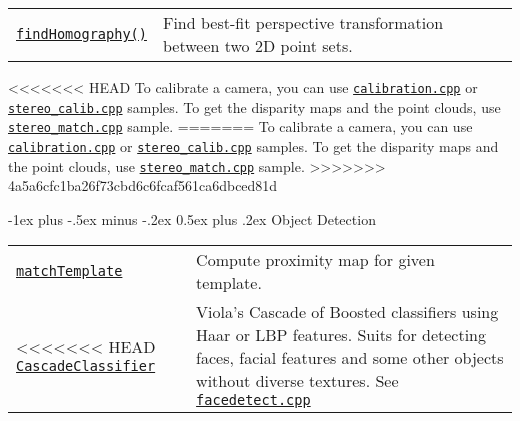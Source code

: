 \documentclass[10pt,landscape]{article}
\makeatletter
\renewcommand{\section}{\@startsection{section}{1}{0mm}%
                                {-1ex plus -.5ex minus -.2ex}%
                                {0.5ex plus .2ex}%
                                {\normalfont\large\bfseries}}
\makeatother
\begin{document}
\begin{multicols}{3}
\begin{tabular}{@{}p{\the\MyLen}%
                @{}p{\linewidth-\the\MyLen}@{}}
\texttt{\href{http://docs.opencv.org/modules/calib3d/doc/camera_calibration_and_3d_reconstruction.html\#findhomography}{findHomography()}} & Find best-fit perspective transformation between two 2D point sets. \\

\end{tabular}

<<<<<<< HEAD
To calibrate a camera, you can use \texttt{\href{https://github.com/Itseez/opencv/tree/master/samples/cpp/calibration.cpp}{calibration.cpp}} or
\texttt{\href{https://github.com/Itseez/opencv/tree/master/samples/cpp/stereo\_calib.cpp}{stereo\_calib.cpp}} samples.
To get the disparity maps and the point clouds, use
\texttt{\href{https://github.com/Itseez/opencv/tree/master/samples/cpp/stereo\_match.cpp}{stereo\_match.cpp}} sample.
=======
To calibrate a camera, you can use \texttt{\href{https://github.com/opencv/opencv/tree/master/samples/cpp/calibration.cpp}{calibration.cpp}} or
\texttt{\href{https://github.com/opencv/opencv/tree/master/samples/cpp/stereo\_calib.cpp}{stereo\_calib.cpp}} samples.
To get the disparity maps and the point clouds, use
\texttt{\href{https://github.com/opencv/opencv/tree/master/samples/cpp/stereo\_match.cpp}{stereo\_match.cpp}} sample.
>>>>>>> 4a5a6cfc1ba26f73cbd6c6fcaf561ca6dbced81d

\section{Object Detection}

\begin{tabular}{@{}p{\the\MyLen}%
                @{}p{\linewidth-\the\MyLen}@{}}
                \texttt{\href{http://docs.opencv.org/modules/imgproc/doc/object_detection.html\#matchtemplate}{matchTemplate}} & Compute proximity map for given template.\\

<<<<<<< HEAD
\texttt{\href{http://docs.opencv.org/modules/objdetect/doc/cascade_classification.html\#cascadeclassifier}{CascadeClassifier}} & Viola's Cascade of Boosted classifiers using Haar or LBP features. Suits for detecting faces, facial features and some other objects without diverse textures. See \texttt{\href{https://github.com/Itseez/opencv/tree/master/samples/c/facedetect.cpp}{facedetect.cpp}}\\


\end{tabular}
\end{multicols}
\end{document}
